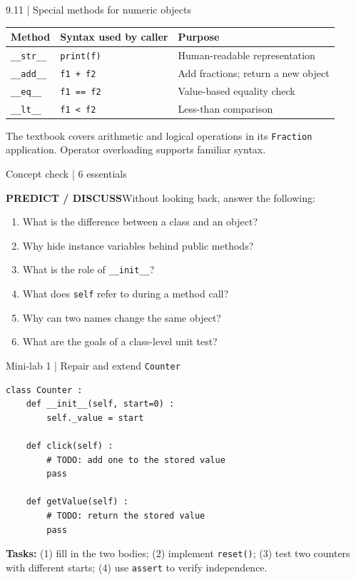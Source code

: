 \documentclass[10pt,aspectratio=169]{beamer}
\newcommand{\prompt}[1]{\begin{block}{\texorpdfstring{\textbf{PREDICT / DISCUSS}}{PREDICT / DISCUSS}}#1\end{block}}
\begin{document}
\begin{frame}{9.11 | Special methods for numeric objects}
\small\begin{tabular}{p{.22\linewidth}p{.31\linewidth}p{.38\linewidth}}
\toprule\textbf{Method}&\textbf{Syntax used by caller}&\textbf{Purpose}\\\midrule
\texttt{\_\_str\_\_} & \texttt{print(f)} & Human-readable representation\\[4pt]
\texttt{\_\_add\_\_} & \texttt{f1 + f2} & Add fractions; return a new object\\[4pt]
\texttt{\_\_eq\_\_} & \texttt{f1 == f2} & Value-based equality check\\[4pt]
\texttt{\_\_lt\_\_} & \texttt{f1 < f2} & Less-than comparison\\\bottomrule
\end{tabular}
\vspace{5pt}\small The textbook covers arithmetic and logical operations in its \texttt{Fraction} application. Operator overloading supports familiar syntax.
\end{frame}

\begin{frame}{Concept check | 6 essentials}
\prompt{Without looking back, answer the following:}
\begin{enumerate}\setlength{\itemsep}{4pt}
\item What is the difference between a class and an object?
\item Why hide instance variables behind public methods?
\item What is the role of \texttt{\_\_init\_\_}?
\item What does \texttt{self} refer to during a method call?
\item Why can two names change the same object?
\item What are the goals of a class-level unit test?
\end{enumerate}
\end{frame}

\begin{frame}[fragile]{Mini-lab 1 | Repair and extend \texttt{Counter}}
\begin{lstlisting}
class Counter :
    def __init__(self, start=0) :
        self._value = start

    def click(self) :
        # TODO: add one to the stored value
        pass

    def getValue(self) :
        # TODO: return the stored value
        pass
\end{lstlisting}
\small\textbf{Tasks:} (1) fill in the two bodies; (2) implement \texttt{reset()}; (3) test two counters with different starts; (4) use \texttt{assert} to verify independence.
\end{frame}
\end{document}
